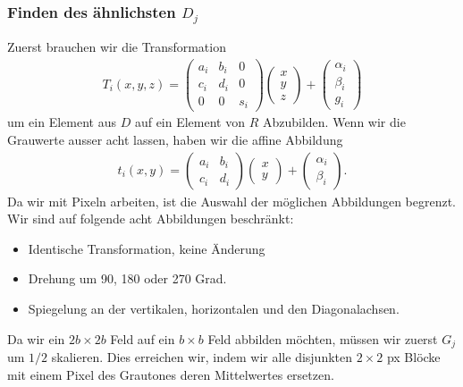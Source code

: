\subsubsection{Finden des ähnlichsten $D_j$}
Zuerst brauchen wir die Transformation 
\begin{align*}
	T_i(x,y,z) = 
	\begin{pmatrix}
		a_i & b_i & 0 \\
		c_i & d_i & 0 \\
		0 & 0 & s_i
	\end{pmatrix}
	\begin{pmatrix}
		x \\
		y \\
		z
	\end{pmatrix}
	+
	\begin{pmatrix}
		\alpha_i \\
		\beta_i \\
		g_i
	\end{pmatrix}
\end{align*}
um ein Element aus $D$ auf ein Element von $R$ Abzubilden.
Wenn wir die Grauwerte ausser acht lassen, haben wir die affine Abbildung
\begin{align}
	t_i(x,y) = 	
	\begin{pmatrix}
		a_i & b_i \\
		c_i & d_i
	\end{pmatrix}
	\begin{pmatrix}
		x \\
		y
	\end{pmatrix}
	+
	\begin{pmatrix}
		\alpha_i \\
		\beta_i
	\end{pmatrix}.
\label{ifs:affTrans}
\end{align}
Da wir mit Pixeln arbeiten, ist die Auswahl der möglichen Abbildungen begrenzt.
Wir sind auf folgende acht Abbildungen beschränkt:
\begin{itemize}
	\item Identische Transformation, keine Änderung
	\item Drehung um 90, 180 oder 270 Grad.
	\item Spiegelung an der vertikalen, horizontalen und den Diagonalachsen.
\end{itemize}
Da wir ein $2b \times 2b$ Feld auf ein $b \times b$ Feld abbilden möchten, müssen wir zuerst $G_j$ um $1/2$ skalieren.
Dies erreichen wir, indem wir alle disjunkten $2 \times 2$ px Blöcke mit einem Pixel des Grautones deren Mittelwertes ersetzen.


